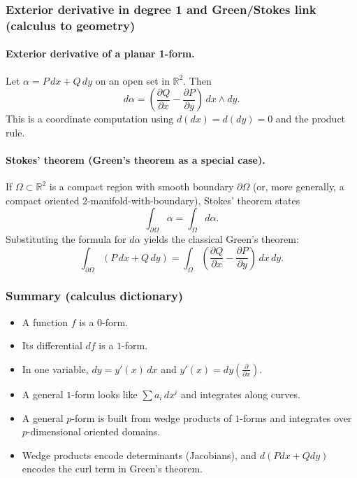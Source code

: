 \documentclass[12pt,a4paper]{article}
\theoremstyle{plain}
\theoremstyle{definition}      %
\begin{document}
\subsubsection*{Exterior derivative in degree 1 and Green/Stokes link (calculus to geometry)}

\paragraph{Exterior derivative of a planar 1-form.}
Let $\alpha=P\,dx+Q\,dy$ on an open set in $\mathbb{R}^2$. Then
\[
d\alpha = \left(\frac{\partial Q}{\partial x}-\frac{\partial P}{\partial y}\right)\,dx\wedge dy.
\]
This is a coordinate computation using $d(dx)=d(dy)=0$ and the product rule.

\paragraph{Stokes' theorem (Green's theorem as a special case).}
If $\Omega\subset\mathbb{R}^2$ is a compact region with smooth boundary $\partial\Omega$ (or, more generally, a compact
oriented $2$-manifold-with-boundary), Stokes' theorem states
\[
\int_{\partial\Omega}\alpha = \int_{\Omega} d\alpha.
\]
Substituting the formula for $d\alpha$ yields the classical Green's theorem:
\[
\int_{\partial\Omega} (P\,dx+Q\,dy)
=
\int_{\Omega} \left(\frac{\partial Q}{\partial x}-\frac{\partial P}{\partial y}\right)\,dx\,dy.
\]

\subsubsection*{Summary (calculus dictionary)}
\begin{itemize}
	\item A function $f$ is a $0$-form.
	\item Its differential $df$ is a $1$-form.
	\item In one variable, $dy = y'(x)\,dx$ and $y'(x)=dy\!\left(\frac{\partial}{\partial x}\right)$.
	\item A general $1$-form looks like $\sum a_i\,dx^i$ and integrates along curves.
	\item A general $p$-form is built from wedge products of $1$-forms and integrates over $p$-dimensional oriented domains.
	\item Wedge products encode determinants (Jacobians), and $d(Pdx+Qdy)$ encodes the curl term in Green's theorem.
\end{itemize}
\end{document}
